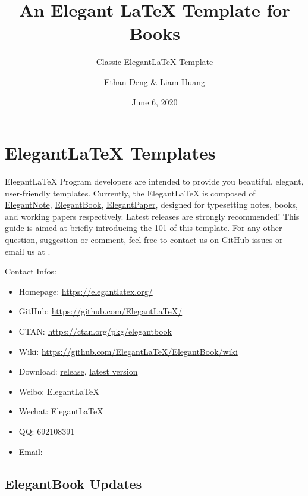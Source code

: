 \documentclass[11pt,fancy,authoryear]{elegantbook}
\title{An Elegant \LaTeX{} Template for Books}
\subtitle{Classic Elegant\LaTeX{} Template}
\author{Ethan Deng \& Liam Huang}
\institute{Elegant\LaTeX{} Program}
\date{June 6, 2020}
\begin{document}
\maketitle

\frontmatter
\tableofcontents

\mainmatter
\chapter{Elegant\LaTeX{} Templates}
Elegant\LaTeX{} Program developers are intended to provide you beautiful, elegant, user-friendly templates. Currently, the Elegant\LaTeX{} is composed of \href{https://github.com/ElegantLaTeX/ElegantNote}{ElegantNote}, \href{https://github.com/ElegantLaTeX/ElegantBook}{ElegantBook}, \href{https://github.com/ElegantLaTeX/ElegantPaper}{ElegantPaper}, designed for typesetting notes, books, and working papers respectively. Latest releases are strongly recommended! This guide is aimed at briefly introducing the 101 of this template. For any other question, suggestion or comment, feel free to contact us on GitHub \href{https://github.com/ElegantLaTeX/ElegantBook/issues}{issues} or email us at .

Contact Infos:
\begin{itemize}
  \item Homepage: \href{https://elegantlatex.org/}{https://elegantlatex.org/}
  \item GitHub: \href{https://github.com/ElegantLaTeX/}{https://github.com/ElegantLaTeX/}
  \item CTAN: \href{https://ctan.org/pkg/elegantbook}{https://ctan.org/pkg/elegantbook}
  \item Wiki: \href{https://github.com/ElegantLaTeX/ElegantBook/wiki}{https://github.com/ElegantLaTeX/ElegantBook/wiki}
  \item Download: \href{https://github.com/ElegantLaTeX/ElegantBook/releases}{release}, \href{https://github.com/ElegantLaTeX/ElegantBook/archive/master.zip}{latest version}
  \item Weibo: Elegant\LaTeX{}
  \item Wechat: Elegant\LaTeX{}
  \item QQ: 692108391
  \item Email: 
\end{itemize}


\section{ElegantBook Updates}
\end{document}
